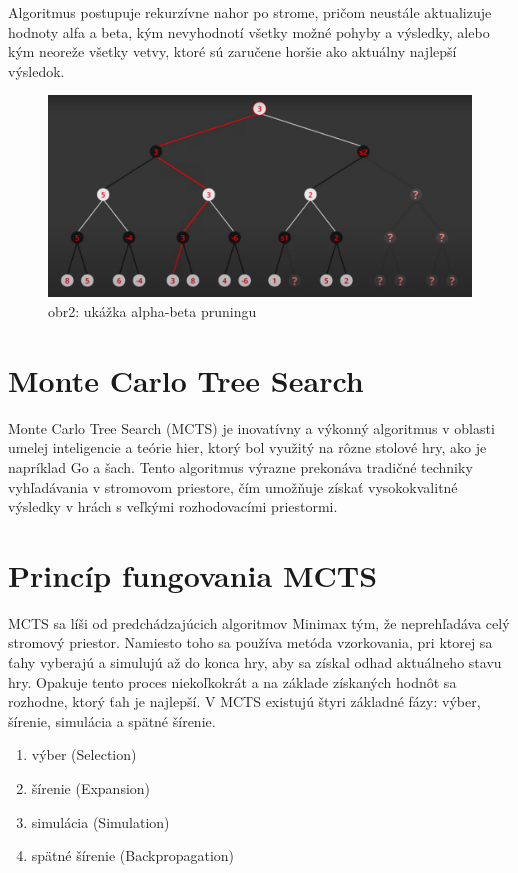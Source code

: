 \documentclass[10pt,twoside,slovak,a4paper]{article}
\begin{document}
Algoritmus postupuje rekurzívne nahor po strome, pričom neustále aktualizuje hodnoty alfa a beta, kým nevyhodnotí všetky možné pohyby a výsledky, alebo kým neoreže všetky vetvy, ktoré sú zaručene horšie ako aktuálny najlepší výsledok.
\begin{figure}[h]
    \centering
    \includegraphics[width=\textwidth]{alpha-beta}
    \caption{obr2: ukážka alpha-beta pruningu}
    \label{obr2}
\end{figure}


\section{Monte Carlo Tree Search} \label{MonteCarlo}
Monte Carlo Tree Search (MCTS) je inovatívny a výkonný algoritmus v oblasti umelej inteligencie a teórie hier, ktorý bol využitý na rôzne stolové hry, ako je napríklad Go a šach. Tento algoritmus výrazne prekonáva tradičné techniky vyhľadávania v stromovom priestore, čím umožňuje získať vysokokvalitné výsledky v hrách s veľkými rozhodovacími priestormi.

\section{Princíp fungovania MCTS} \label{PrincipMTCS}
MCTS sa líši od predchádzajúcich algoritmov Minimax tým, že neprehľadáva celý stromový priestor. Namiesto toho sa používa metóda vzorkovania, pri ktorej sa ťahy vyberajú a simulujú až do konca hry, aby sa získal odhad aktuálneho stavu hry. Opakuje tento proces niekoľkokrát a na základe získaných hodnôt sa rozhodne, ktorý ťah je najlepší. V MCTS existujú štyri základné fázy: výber, šírenie, simulácia a spätné šírenie.
\begin{enumerate}
	\item výber (Selection)
	\item šírenie (Expansion)
	\item simulácia (Simulation)
	\item spätné šírenie (Backpropagation)
\end{enumerate}
\end{document}
